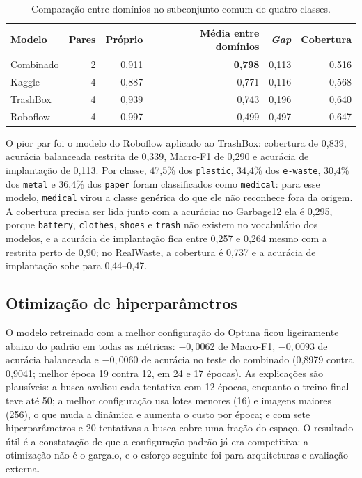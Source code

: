 \documentclass[11pt,a4paper]{article}
\begin{document}
	\begin{table}[htbp]
		\centering
		\footnotesize
		\caption{Comparação entre domínios no subconjunto comum de quatro classes.}
		\label{tab:cross}
		\begin{tabular}{lrrrrr}
			\toprule
			\textbf{Modelo} & \textbf{Pares} & \textbf{Próprio} & \textbf{Média entre domínios} & \textbf{\emph{Gap}} & \textbf{Cobertura} \\
			\midrule
			Combinado & 2 & 0,911 & \textbf{0,798} & 0,113 & 0,516 \\
			Kaggle & 4 & 0,887 & 0,771 & 0,116 & 0,568 \\
			TrashBox & 4 & 0,939 & 0,743 & 0,196 & 0,640 \\
			Roboflow & 4 & 0,997 & 0,499 & 0,497 & 0,647 \\
			\bottomrule
		\end{tabular}
	\end{table}
	
	O pior par foi o modelo do Roboflow aplicado ao TrashBox: cobertura de 0,839, acurácia balanceada restrita de 0,339, Macro-F1 de 0,290 e acurácia de implantação de 0,113. Por classe, 47,5\% dos \texttt{plastic}, 34,4\% dos \texttt{e-waste}, 30,4\% dos \texttt{metal} e 36,4\% dos \texttt{paper} foram classificados como \texttt{medical}: para esse modelo, \texttt{medical} virou a classe genérica do que ele não reconhece fora da origem. A cobertura precisa ser lida junto com a acurácia: no Garbage12 ela é 0,295, porque \texttt{battery}, \texttt{clothes}, \texttt{shoes} e \texttt{trash} não existem no vocabulário dos modelos, e a acurácia de implantação fica entre 0,257 e 0,264 mesmo com a restrita perto de 0,90; no RealWaste, a cobertura é 0,737 e a acurácia de implantação sobe para 0,44--0,47.
	
	\subsection{Otimização de hiperparâmetros}
	\label{sec:optuna}
	
	O modelo retreinado com a melhor configuração do Optuna ficou ligeiramente abaixo do padrão em todas as métricas: $-0{,}0062$ de Macro-F1, $-0{,}0093$ de acurácia balanceada e $-0{,}0060$ de acurácia no teste do combinado (0,8979 contra 0,9041; melhor época 19 contra 12, em 24 e 17 épocas). As explicações são plausíveis: a busca avaliou cada tentativa com 12 épocas, enquanto o treino final teve até 50; a melhor configuração usa lotes menores (16) e imagens maiores (256), o que muda a dinâmica e aumenta o custo por época; e com sete hiperparâmetros e 20 tentativas a busca cobre uma fração do espaço. O resultado útil é a constatação de que a configuração padrão já era competitiva: a otimização não é o gargalo, e o esforço seguinte foi para arquiteturas e avaliação externa.
	
\end{document}
